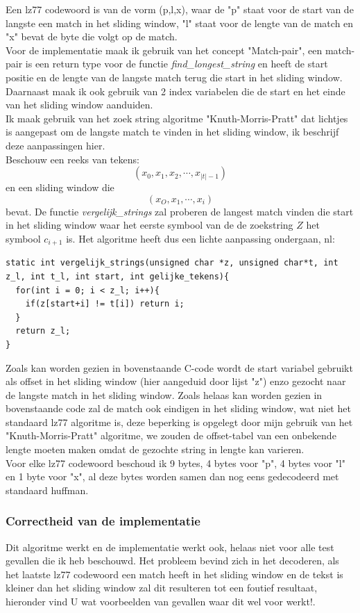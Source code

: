 \documentclass[10pt,a4paper]{report}
\begin{document}
Een lz77 codewoord is van de vorm (p,l,x), waar de "p" staat voor de start van de langste een match in het sliding window, "l" staat voor de lengte van de match en "x" bevat de byte die volgt op de match.\\

Voor de implementatie maak ik gebruik van het concept "Match-pair", een match-pair is een return type voor de functie \emph{find\_longest\_string} en heeft de start positie en de lengte van de langste match terug die start in het sliding window. Daarnaast maak ik ook gebruik van 2 index variabelen die de start en het einde van het sliding window aanduiden.\\

Ik maak gebruik van het zoek string algoritme "Knuth-Morris-Pratt" dat lichtjes is aangepast om de langste match te vinden in het sliding window, ik beschrijf deze aanpassingen hier.\\

Beschouw een reeks van tekens:
$$(x_{0},x_{1},x_{2},\cdots,x_{|t|-1})$$
en een sliding window die 
$$
(x_{O},x_{1},\cdots,x_{i})$$
bevat. De functie \emph{vergelijk\_strings} zal proberen de langest match vinden die start in het sliding window waar het eerste symbool van de de zoekstring $Z$ het symbool $c_{i+1}$ is. Het algoritme heeft dus een lichte aanpassing ondergaan, nl:
\begin{lstlisting}
static int vergelijk_strings(unsigned char *z, unsigned char*t, int z_l, int t_l, int start, int gelijke_tekens){
  for(int i = 0; i < z_l; i++){
    if(z[start+i] != t[i]) return i; 
  }
  return z_l;
}
\end{lstlisting}
Zoals kan worden gezien in bovenstaande C-code wordt de start variabel gebruikt als offset in het sliding window (hier aangeduid door lijst "z") enzo gezocht naar de langste match in het sliding window. Zoals helaas kan worden gezien in bovenstaande code zal de match ook eindigen in het sliding window, wat niet het standaard lz77 algoritme is, deze beperking is opgelegt door mijn gebruik van het "Knuth-Morris-Pratt" algoritme, we zouden de offset-tabel van een onbekende lengte moeten maken omdat de gezochte string in lengte kan varieren. \\

Voor elke lz77 codewoord beschoud ik 9 bytes, 4 bytes voor "p", 4 bytes voor "l" en 1 byte voor "x", al deze bytes worden samen dan nog eens gedecodeerd met standaard huffman. 
\subsubsection*{Correctheid van de implementatie}
Dit algoritme werkt en de implementatie werkt ook, helaas niet voor alle test gevallen die ik heb beschouwd. Het probleem bevind zich in het decoderen, als het laatste lz77 codewoord een match heeft in het sliding window en de tekst is kleiner dan het sliding window zal dit resulteren tot een foutief resultaat, hieronder vind U wat voorbeelden van gevallen waar dit wel voor werkt!.
\end{document}
